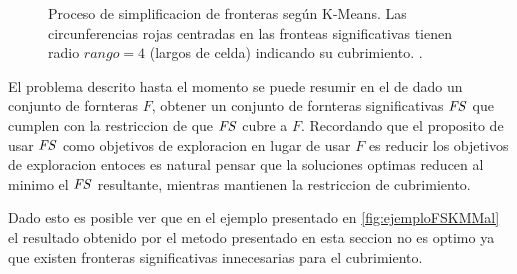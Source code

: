 \begin{figure}[H]
  \caption[Proceso de simplificacion de fronteras según K-Means.]{Proceso de
    simplificacion de fronteras según K-Means. Las circunferencias rojas
    centradas en las fronteas significativas tienen radio $rango=4$ (largos de celda) indicando su
    cubrimiento.
  \cite{Amorin2019}.}\label{fig:ejemploFrontSig}
\end{figure}


El problema descrito hasta el momento se puede resumir en el de  dado un
conjunto de fornteras $F$, obtener un conjunto de fornteras significativas
$\mathit{FS}$ que cumplen con la restriccion de que $\mathit{FS}$ cubre a $F$.
Recordando que el proposito de usar $\mathit{FS}$ como objetivos de exploracion en
lugar de usar $F$ es reducir los objetivos de exploracion entoces es natural
pensar que la soluciones optimas reducen al minimo el $\mathit{FS}$ resultante,
mientras mantienen la restriccion de cubrimiento.


Dado esto es posible ver que en el ejemplo presentado en
\ref{fig:ejemploFSKMMal} el resultado obtenido por el metodo presentado en esta
seccion no es optimo ya que existen fronteras significativas innecesarias para
el cubrimiento. 

